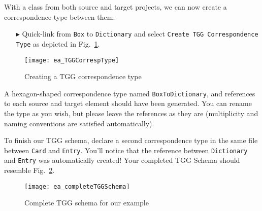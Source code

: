 With a class from both source and target projects, we can now create a correspondence type between them.

\begin{itemize}
\item[$\blacktriangleright$] Quick-link from \texttt{Box} to \texttt{Dictionary} and select \texttt{Create TGG Corres\-pon\-dence Type} as depicted in
Fig.~\ref{fig:create_correspondence}.
\end{itemize}

\begin{figure}[htbp]
\begin{center}
  \texttt{[image: ea\_TGGCorrespType]}
  \caption{Creating a TGG correspondence type} 
  \label{fig:create_correspondence}
\end{center}
\end{figure}

A hexagon-shaped correspondence type named \texttt{BoxToDiction\-ary}, and references to each source and target element should have been generated.
You can rename the type as you wish, but please leave the references as they are (multiplicity and naming conventions are satisfied automatically).

To finish our TGG schema, declare a second correspondence type in the same file between \texttt{Card} and \texttt{Entry}. You'll notice that the
reference between \texttt{Dictionary} and \texttt{Entry} was automatically created! Your completed TGG Schema should resemble
Fig.~\ref{fig:complete_tgg_schema}.

\begin{figure}[htbp]
\begin{center}
  \texttt{[image: ea\_completeTGGSchema]}
  \caption{Complete TGG schema for our example}
  \label{fig:complete_tgg_schema}
\end{center}
\end{figure}

